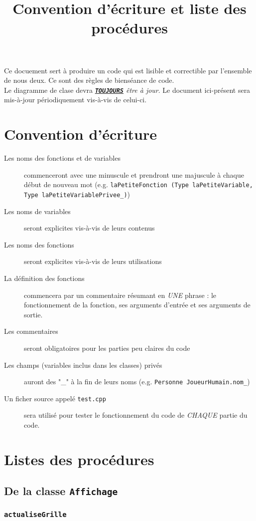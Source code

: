 \documentclass[12pt,a4paper]{article}
\date{}
\title{Convention d'écriture et liste des procédures}
\begin{document}
	\maketitle
	Ce docuement sert à produire un code qui est lisible et correctible par l'ensemble de nous deux. Ce sont des règles de bienséance de code.\\
	 Le diagramme de clase devra \emph{\texttt{\underline{\textbf{TOUJOURS}}} être à jour}. Le document ici-présent sera mis-à-jour périodiquement vis-à-vis de celui-ci.
	\section{Convention d'écriture}
		\begin{description}
			\item[Les noms des fonctions et de variables] commenceront avec une minuscule et prendront une majuscule à chaque début de nouveau mot (e.g. \texttt{laPetiteFonction (Type laPetiteVariable, Type laPetiteVariablePrivee\_)})
			\item[Les noms de variables] seront explicites vis-à-vis de leurs contenus
			\item[Les noms des fonctions] seront explicites vis-à-vis de leurs utilisations
			\item[La définition des fonctions] commencera par un commentaire résumant en \emph{UNE} phrase : le fonctionnement de la fonction, ses arguments d'entrée et ses arguments de sortie.
			\item[Les commentaires] seront obligatoires pour les parties peu claires du code
			\item[Les champs (variables inclus dans les classes) privés] auront des "\_" à la fin de leurs noms (e.g. \texttt{Personne JoueurHumain.nom\_})
			\item[Un ficher source appelé \texttt{test.cpp}] sera utilisé pour tester le fonctionnement du code de \emph{CHAQUE} partie du code.
		\end{description}
		
	\section{Listes des procédures}
		\subsection{De la classe \texttt{Affichage}}
			\subsubsection{\texttt{actualiseGrille}}
\end{document}
